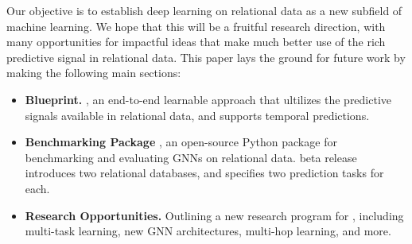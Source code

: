   

Our objective is to establish deep learning on relational data as a new subfield of machine learning. We hope that this will be a fruitful research direction, with many opportunities for impactful ideas that make much better use of the rich predictive signal in relational data. This paper lays the ground for future work by making the following main sections:
\begin{itemize}
    \item \textbf{Blueprint.} {\em \AreaName}, an end-to-end learnable approach that ultilizes the predictive signals available in relational data, and supports temporal predictions.
    \item \textbf{Benchmarking Package} {\em \BenchmarkName}, an open-source Python package for benchmarking and evaluating GNNs on relational data. {\BenchmarkName} beta release introduces two relational databases, and specifies two prediction tasks for each. 
    \item \textbf{Research Opportunities.} Outlining a new research program for  \AreaName, including multi-task learning, new GNN architectures, multi-hop learning, and more.
\end{itemize}


